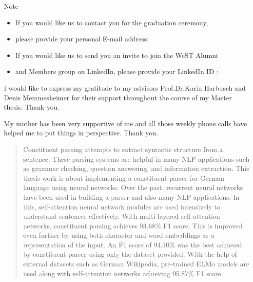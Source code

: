 \documentclass[a4paper, 11pt]{article}
\begin{document}

\vspace{2em}
        \begin{flushleft}
        	\begin{Large}
                	Note
              \\[5mm]
        	\end{Large}
            \begin{itemize}
            	\item If you would like us to contact you for the graduation ceremony, 
                \item[] please provide your personal E-mail address: \dotfill
                \item If you would like us to send you an invite to join the WeST Alumni 
                \item[] and Members group on LinkedIn, please provide your LinkedIn ID : \dotfill
            \end{itemize}
            \cleardoublepage%
        \end{flushleft}
\pagebreak      



\vspace*{\fill}
I would like to express my gratitude to my advisors Prof.Dr.Karin Harbusch and Denis Memmesheimer for their support throughout the course of my Master thesis. Thank you.

My mother has been very supportive of me and all those weekly phone calls have helped me to put things in perspective. Thank you.
\vspace*{\fill}


  \cleardoublepage%
\pagebreak        


\begin{abstract}

Constituent parsing attempts to extract syntactic structure from a sentence. These parsing systems are helpful in many NLP applications such as grammar checking, question answering, and information extraction. This thesis work is about implementing a constituent parser for German language using neural networks. Over the past, recurrent neural networks have been used in building a parser and also many NLP applications. In this, self-attention neural network modules are used intensively to understand sentences effectively. With multi-layered self-attention networks, constituent parsing achieves 93.68\% F1 score. This is improved even further by using both character and word embeddings as a representation of the input. An F1 score of 94.10\% was the best achieved by constituent parser using only the dataset provided. With the help of external datasets such as German Wikipedia, pre-trained ELMo models are used along with self-attention networks achieving 95.87\% F1 score. 
\end{abstract}
\pagebreak
\end{document}
